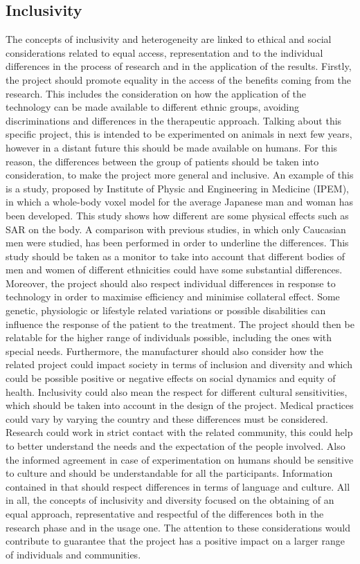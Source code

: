 \documentclass{Configuration_Files/PoliMi3i_thesis}
\begin{document}
\subsection{Inclusivity}
 

The concepts of inclusivity and heterogeneity are linked to ethical and social considerations related to equal access, representation and to the individual differences in the process of research and in the application of the results.
Firstly, the project should promote equality in the access of the benefits coming from the research. This includes the consideration on how the application of the technology can be made available to different ethnic groups, avoiding discriminations and differences in the therapeutic approach.
Talking about this specific project, this is intended to be experimented on animals in next few years, however in a distant future this should be made available on humans. For this reason, the differences between the group of patients should be taken into consideration, to make the project more general and inclusive. An example of this is a study, \cite{nagaokaDevelopmentRealisticHighresolution2004} proposed by Institute of Physic and Engineering in Medicine (IPEM), in which a whole-body voxel model for the average Japanese man and woman has been developed. This study shows how different are some physical effects such as SAR on the body. A comparison with previous studies, in which only Caucasian men were studied, has been performed in order to underline the differences. This study should be taken as a monitor to take into account that different bodies of men and women of different ethnicities could have some substantial differences. Moreover, the project should also respect individual differences in response to technology in order to maximise efficiency and minimise collateral effect. Some genetic, physiologic or lifestyle related variations or possible disabilities can influence the response of the patient to the treatment. The project should then be relatable for the higher range of individuals possible, including the ones with special needs. Furthermore, the manufacturer should also consider how the related project could impact society in terms of inclusion and diversity and which could be possible positive or negative effects on social dynamics and equity of health.
Inclusivity could also mean the respect for different cultural sensitivities, which should be taken into account in the design of the project. Medical practices could vary by varying the country and these differences must be considered. Research could work in strict contact with the related community, this could help to better understand the needs and the expectation of the people involved.
Also the informed agreement in case of experimentation on humans should be sensitive to culture and should be understandable for all the participants. Information contained in that should respect differences in terms of language and culture.
All in all, the concepts of inclusivity and diversity focused on the obtaining of an equal approach, representative and respectful of the differences both in the research phase and in the usage one. The attention to these considerations would contribute to guarantee that the project has a positive impact on a larger range of individuals and communities.
\end{document}

